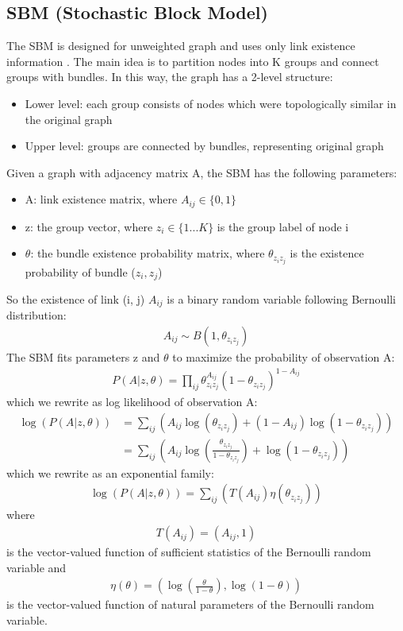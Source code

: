 \documentclass[letterpaper]{article}
\begin{document}
\subsection{SBM (Stochastic Block Model)}
The SBM is designed for unweighted graph and uses only link existence information \cite{holland1983stochastic}.
The main idea is to partition nodes into K groups and connect groups with bundles.
In this way, the graph has a 2-level structure:
\begin{itemize}
	\item Lower level: each group consists of nodes which were topologically similar in the original graph
	\item Upper level: groups are connected by bundles, representing original graph
\end{itemize}
Given a graph with adjacency matrix A, the SBM has the following parameters:
\begin{itemize}
	\item A: link existence matrix, where $ A_{ij} \in \{0, 1\} $
	\item z: the group vector,
	where $ z_i \in \{ 1 ... K \} $ is the group label of node i
	\item $ \theta $: the bundle existence probability matrix,
	where $ \theta_{z_i z_j} $ is the existence probability of bundle ($z_i, z_j$)
\end{itemize}
So the existence of link (i, j) $ A_{ij} $ is a binary random variable following Bernoulli distribution:
\begin{align*}
	A_{ij} \sim B(1, \theta_{z_i z_j})
\end{align*}
The SBM fits parameters z and $ \theta $
to maximize the probability of observation A:
\begin{align*}
	P(A|z, \theta) 
	= \prod_{ij} \theta_{z_i z_j}^{A_{ij}}(1-\theta_{z_i z_j})^{1-A_{ij}}
\end{align*}
which we rewrite as log likelihood of observation A:
\begin{align*}
	\log(P(A|z, \theta))
	&= \sum_{ij} (
	{A_{ij}} \log (\theta_{z_i z_j})
	+ (1 - {A_{ij}}) \log(1-\theta_{z_i z_j})
	)\\
	&= \sum_{ij} (
	{A_{ij}} \log (\frac{\theta_{z_i z_j}}{1-\theta_{z_i z_j}})
	+ \log(1-\theta_{z_i z_j})
	)
\end{align*}
which we rewrite as an exponential family:
\begin{align*}
	\log(P(A|z, \theta))
	= \sum_{ij} (
	T(A_{ij}) \eta(\theta_{z_i z_j})
	)
\end{align*}
where
\begin{align*}
	T(A_{ij}) = (A_{ij}, 1)
\end{align*}
is the vector-valued function of sufficient statistics of the Bernoulli random variable and
\begin{align*}
\eta(\theta) = ( \log(\frac{\theta}{1-\theta}), \log(1-\theta) )
\end{align*}
is the vector-valued function of natural parameters of the Bernoulli random variable.
\end{document}
